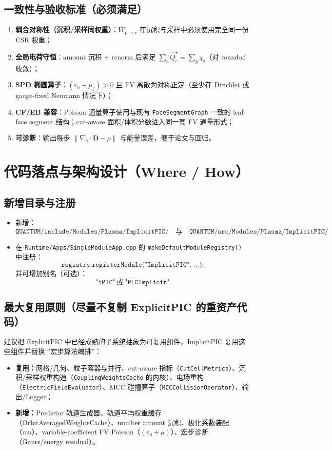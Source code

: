 \documentclass[UTF8,a4paper,12pt]{ctexart}
\newcommand{\code}[1]{\texttt{#1}}
\begin{document}
\subsection{一致性与验收标准（必须满足）}
\begin{enumerate}[leftmargin=2em]
  \item \textbf{耦合对称性（沉积/采样同权重）}：$\overline{W}_{p\to c}$ 在沉积与采样中必须使用完全同一份 CSR 权重；
  \item \textbf{全局电荷守恒}：amount 沉积 + renorm 后满足 $\sum_c \widehat{Q}_c^\star=\sum_p q_p$（对 roundoff 收敛）；
  \item \textbf{SPD 椭圆算子}：$(\varepsilon_0+\mu_f)>0$ 且 FV 离散为对称正定（至少在 Dirichlet 或 gauge-fixed Neumann 情况下）；
  \item \textbf{CF/EB 兼容}：Poisson 通量算子使用与现有 \code{FaceSegmentGraph} 一致的 leaf-face segment 结构；cut-aware 面积/体积分数进入同一套 FV 通量形式；
  \item \textbf{可诊断}：输出每步 $\|\nabla_h\cdot\bm{D}-\rho\|$ 与能量误差，便于论文与回归。
\end{enumerate}

\section{代码落点与架构设计（Where / How）}

\subsection{新增目录与注册}
\begin{itemize}[leftmargin=2em]
  \item 新增：
  \[
    \code{QUANTUM/include/Modules/Plasma/ImplicitPIC/}\quad\text{与}\quad
    \code{QUANTUM/src/Modules/Plasma/ImplicitPIC/}
  \]
  \item 在 \code{Runtime/Apps/SingleModuleApp.cpp} 的 \code{makeDefaultModuleRegistry()} 中注册：
  \[
    \code{registry.registerModule("ImplicitPIC", ...);}
  \]
  并可增加别名（可选）：
  \[
    \code{"iPIC"}\ \text{或}\ \code{"PICImplicit"}
  \]
\end{itemize}

\subsection{最大复用原则（尽量不复制 ExplicitPIC 的重资产代码）}
建议把 ExplicitPIC 中已经成熟的子系统抽象为可复用组件，ImplicitPIC 复用这些组件并替换 ``宏步算法编排''：
\begin{itemize}[leftmargin=2em]
  \item \textbf{复用：}网格/几何、粒子容器与并行、cut-aware 指标（\code{CutCellMetrics}）、沉积/采样权重构造（\code{CouplingWeightsCache} 的内核）、电场重构（\code{ElectricFieldEvaluator}）、MCC 碰撞算子（\code{MCCCollisionOperator}）、输出/Logger；
  \item \textbf{新增：}Predictor 轨道生成器、轨道平均权重缓存（OrbitAveragedWeightsCache）、number amount 沉积、极化系数装配（mu）、variable-coefficient FV Poisson（$(\varepsilon_0+\mu)$）、宏步诊断（Gauss/energy residual）。
\end{itemize}
\end{document}
